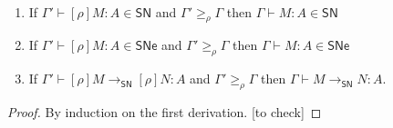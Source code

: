 \documentclass{article}
\newcommand{\ext}[1]{\geq_{#1}}
\newcommand{\SN}{\mathsf{SN}}
\newcommand{\SNe}{\mathsf{SNe}}
\newcommand{\redSN}{\longrightarrow_\SN}
\begin{document}
\begin{lemma}~\label{lm:anti-renameSN}
  \begin{enumerate}
  \item If $\Gamma' \vdash [\rho]M : A \in \SN$ and $\Gamma' \ext{\rho} \Gamma$ then $\Gamma \vdash M : A \in \SN$
  \item If $\Gamma' \vdash [\rho]M : A \in \SNe$ and $\Gamma' \ext{\rho} \Gamma$ then $\Gamma \vdash M : A \in \SNe$
  \item If $\Gamma' \vdash [\rho]M \redSN [\rho]N : A$ and $\Gamma' \ext{\rho} \Gamma$ then $\Gamma \vdash M \redSN N : A$.
  \end{enumerate}
\end{lemma}
\begin{proof}
By induction on the first derivation. [to check]
\end{proof}
\end{document}
